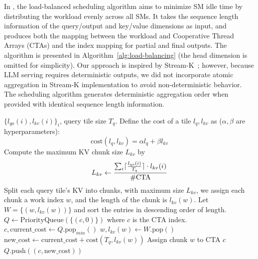 \label{sec:load-balanced-scheduling}

In \sys, the load-balanced scheduling algorithm aims to minimize SM idle time by distributing the workload evenly across all SMs. It takes the sequence length information of the query/output and key/value dimensions as input, and produces both the mapping between the workload and Cooperative Thread Arrays (CTAs) and the index mapping for partial and final outputs. The algorithm is presented in Algorithm~\ref{alg:load-balancing} (the head dimension is omitted for simplicity). Our approach is inspired by Stream-K~\cite{osama2023streamk}; however, because LLM serving requires deterministic outputs, we did not incorporate atomic aggregation in Stream-K implementation to avoid non-deterministic behavior. The scheduling algorithm generates deterministic aggregation order when provided with identical sequence length information.
\begin{algorithm}[tb]
   \scriptsize
   \caption{\sys's balanced scheduling algorithm}
   \label{alg:load-balancing}
\begin{algorithmic}[1]
    $\{l_{qo}(i), l_{kv}(i)\}_i$, query tile size $T_q$.
   \STATE Define the cost of a tile $l_q, l_{kv}$ as ($\alpha, \beta$ are hyperparameters):
   $$\textrm{cost}(l_q, l_{kv}) = \alpha l_q + \beta l_{kv} $$
   \STATE Compute the maximum KV chunk size $L_{kv}$ by
   \vspace{-1em}
   $$L_{kv} \leftarrow \frac{\sum_{i}\lceil\frac{l_{qo}(i)}{T_q}\rceil\cdot l_{kv}(i)}{\#\textrm{CTA}}$$
   \STATE Split each query tile's KV into chunks, with maximum size $L_{kv}$, we assign each chunk a work index $w$, and the length of the chunk is $l_{kv}(w)$.
   \STATE Let $W = \{(w, l_{kv}(w))\}$ and sort the entries in descending order of length.
   \STATE $Q \leftarrow \textrm{PriorityQueue}(\{(c, 0)\})$ where $c$ is the CTA index.
      \STATE $c, \textrm{current\_cost} \leftarrow Q.\textrm{pop}_{min}()$
      \STATE $w, l_{kv}(w) \leftarrow W.\textrm{pop}()$
      \STATE $\textrm{new\_cost} \leftarrow \textrm{current\_cost} + \textrm{cost}(T_q, l_{kv}(w))$
      \STATE Assign chunk $w$ to CTA $c$
      \STATE $Q.\textrm{push}((c, \textrm{new\_cost}))$
   \ENDWHILE
\end{algorithmic}
   \normalsize
\end{algorithm}

